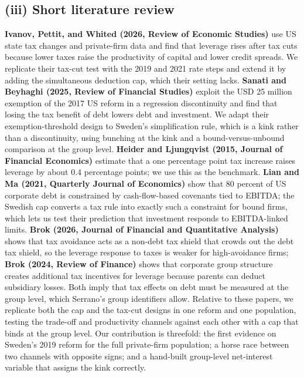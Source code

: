 \documentclass[12pt,a4paper]{article}
\begin{document}
\subsection{(iii) Short literature review}

\textbf{Ivanov, Pettit, and Whited (2026, Review of Economic Studies)} use US state tax changes and private-firm data and find that leverage rises after tax cuts because lower taxes raise the productivity of capital and lower credit spreads. We replicate their tax-cut test with the 2019 and 2021 rate steps and extend it by adding the simultaneous deduction cap, which their setting lacks. \textbf{Sanati and Beyhaghi (2025, Review of Financial Studies)} exploit the USD 25 million exemption of the 2017 US reform in a regression discontinuity and find that losing the tax benefit of debt lowers debt and investment. We adapt their exemption-threshold design to Sweden's simplification rule, which is a kink rather than a discontinuity, using bunching at the kink and a bound-versus-unbound comparison at the group level. \textbf{Heider and Ljungqvist (2015, Journal of Financial Economics)} estimate that a one percentage point tax increase raises leverage by about 0.4 percentage points; we use this as the benchmark. \textbf{Lian and Ma (2021, Quarterly Journal of Economics)} show that 80 percent of US corporate debt is constrained by cash-flow-based covenants tied to EBITDA; the Swedish cap converts a tax rule into exactly such a constraint for bound firms, which lets us test their prediction that investment responds to EBITDA-linked limits. \textbf{Brok (2026, Journal of Financial and Quantitative Analysis)} shows that tax avoidance acts as a non-debt tax shield that crowds out the debt tax shield, so the leverage response to taxes is weaker for high-avoidance firms; \textbf{Brok (2024, Review of Finance)} shows that corporate group structure creates additional tax incentives for leverage because parents can deduct subsidiary losses. Both imply that tax effects on debt must be measured at the group level, which Serrano's group identifiers allow. Relative to these papers, we replicate both the cap and the tax-cut designs in one reform and one population, testing the trade-off and productivity channels against each other with a cap that binds at the group level. Our contribution is threefold: the first evidence on Sweden's 2019 reform for the full private-firm population; a horse race between two channels with opposite signs; and a hand-built group-level net-interest variable that assigns the kink correctly.
\end{document}
